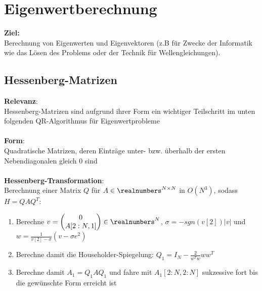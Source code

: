 \section{Eigenwertberechnung}%
\label{ew:sec:eigenwertberechnung}
\textbf{Ziel:}\\Berechnung von Eigenwerten und Eigenvektoren (z.B für Zwecke der Informatik wie das Lösen des Problems  oder der Technik für Wellengleichungen).

\subsection{Hessenberg-Matrizen}%
\label{ew:sub:hessenberg-matrizen}
\textbf{Relevanz}:\\Hessenberg-Matrizen sind aufgrund ihrer Form ein wichtiger Teilschritt im unten folgenden QR-Algorithmus für Eigenwertprobleme\\\\
\textbf{Form}:\\Quadratische Matrizen, deren Einträge unter- bzw. überhalb der ersten Nebendiagonalen gleich $0$ sind\\\\
\textbf{Hessenberg-Transformation}:\\Berechnung einer Matrix $Q$ für $A \in \realnumbers^{N\times N}$ in $O(N^3)$, sodass $H = QAQ^T$:
\begin{enumerate}
	\item Berechne $v = \begin{pmatrix}0\\A[2:N,1]\end{pmatrix} \in \realnumbers^N$, $\sigma = -sgn(v[2])|v|$ und $w = \frac{1}{v[2] - \sigma}(v - \sigma e^2)$
	\item Berechne damit die Householder-Spiegelung: $Q_1 = I_N - \frac{2}{w^Tw}ww^T$
	\item Berechne damit $A_1 = Q_1AQ_1$ und fahre mit $A_1[2:N, 2:N]$ sukzessive fort bis die gewünschte Form erreicht ist
\end{enumerate}

